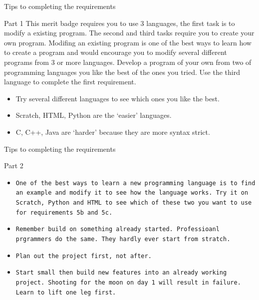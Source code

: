 \documentclass[10pt]{beamer}
\begin{document}
{\begin{frame}{Tips to completing the requirements}{}
\begin{block}{Part 1}
This merit badge requires you to use 3 languages, the first task is to modify a existing program.  The second and third tasks require you to create your own program.  Modifing an existing program is one of the best ways to learn how to create a program and would encourage you to modify several different programs from 3 or more languages.  Develop a program of your own from two of programming languages you like the best of the ones you tried.  Use the third language to complete the first requirement.
  \begin{itemize}
    \item {Try several different languages to see which ones you like the best.}
    \item {Scratch, HTML, Python are the `easier' languages.}
    \item {C, C++, Java are `harder' because they are more syntax strict.}
    \end{itemize}

  \end{block}
\end{frame}


\begin{frame}{Tips to completing the requirements}{}
\begin{block}{Part 2}
  \begin{itemize}
    \item {\tt One of the best ways to learn a new programming language is to find an example and modify it to see how the language works.  Try it on Scratch, Python and HTML to see which of these two you want to use for requirements 5b and 5c.}
    \item {\tt Remember build on something already started.  Professioanl prgrammers do the same.  They hardly ever start from stratch.}
    \item {\tt Plan out the project first, not after. }
    \item {\tt Start small then build new features into an already working project.  Shooting for the moon on day 1 will result in failure.  Learn to lift one leg first. }
    \end{itemize}
  \end{block}
\end{frame}

}
\end{document}
